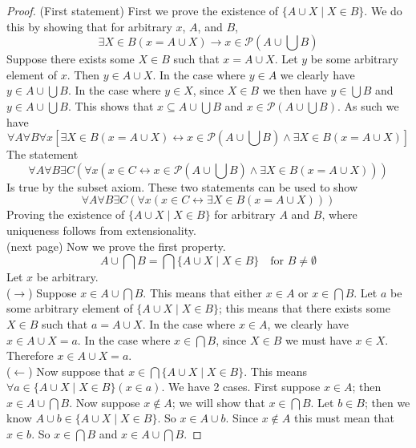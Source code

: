 \documentclass{report}
\begin{document}
\begin{proof} 
(First statement) First we prove the existence of $\{A\cup X\mid X\in B\}$. We do this by showing that for arbitrary $x$, $A$, and $B$,
\begin{equation*}
\exists X\in B(x=A\cup X)\to x\in\mathscr P(A\cup\bigcup B)
\end{equation*}
Suppose there exists some $X\in B$ such that $x=A\cup X$. Let $y$ be some arbitrary element of $x$.
Then $y\in A\cup X$. In the case where $y\in A$ we clearly have $y\in A\cup\bigcup B$. In the case where $y\in X$, since $X\in B$ we then have $y\in\bigcup B$ and $y\in A\cup\bigcup B$.
This shows that $x\subseteq A\cup\bigcup B$ and $x\in\mathscr P(A\cup\bigcup B)$.
As such we have
\begin{equation*}
\forall A\forall B\forall x[\exists X\in B(x=A\cup X)\leftrightarrow x\in\mathscr P(A\cup\bigcup B)\land\exists X\in B(x=A\cup X)]
\end{equation*}
The statement
\begin{equation*}
\forall A\forall B\exists C(\forall x(x\in C\leftrightarrow x\in\mathscr P(A\cup\bigcup B)\land\exists X\in B(x=A\cup X)))
\end{equation*}
Is true by the subset axiom. These two statements can be used to show
\begin{equation*}
\forall A\forall B\exists C(\forall x(x\in C\leftrightarrow\exists X\in B(x=A\cup X)))
\end{equation*}
Proving the existence of $\{A\cup X\mid X\in B\}$ for arbitrary $A$ and $B$, where uniqueness follows from extensionality.\\
(next page)\newpage
Now we prove the first property.
\begin{equation*}
A\cup\bigcap B=\bigcap\{A\cup X\mid X\in B\}\quad\text{for $B\neq\emptyset$}
\end{equation*}
Let $x$ be arbitrary.\\
\indent($\rightarrow$) Suppose $x\in A\cup\bigcap B$. This means that either $x\in A$ or $x\in\bigcap B$.
Let $a$ be some arbitrary element of $\{A\cup X\mid X\in B\}$; this means that there exists some $X\in B$ such that $a=A\cup X$. In the case where $x\in A$, we clearly have $x\in A\cup X=a$.
In the case where $x\in\bigcap B$, since $X\in B$ we must have $x\in X$. Therefore $x\in A\cup X=a$.\\
\indent($\leftarrow$) Now suppose that $x\in\bigcap\{A\cup X\mid X\in B\}$. This means $\forall a\in\{A\cup X\mid X\in B\}(x\in a)$. We have 2 cases. First suppose $x\in A$; then 
$x\in A\cup\bigcap B$. Now suppose $x\notin A$; we will show that $x\in\bigcap B$. Let $b\in B$; then we know $A\cup b\in\{A\cup X\mid X\in B\}$. So $x\in A\cup b$. Since $x\notin A$ this must 
mean that $x\in b$. So $x\in\bigcap B$ and $x\in A\cup\bigcap B$.
\end{proof}
\end{document}

